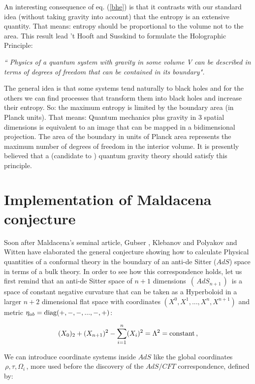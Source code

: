 \documentclass[a4paper,twocolumn,prd,groupedaddress,nofootinbib]{revtex4}
\begin{document}
An interesting consequence of eq. (\ref{bhe}) is that it contrasts with our standard
idea (without taking gravity into account) that the entropy 
is an extensive quantity. That means: entropy should be proportional to the  
volume not to the area.  This result lead 't Hooft and Susskind to formulate 
the Holographic  Principle:

{\it `` Physics of a quantum system with gravity in some \break volume V
can be described in terms of degrees of \break freedom that can be contained
in its boundary".}

\bigskip

\noindent  The general idea is that some systems tend naturally to black holes and
for the others we can find processes that transform them into black holes and increase 
their entropy. So: the maximum entropy is limited by the boundary area (in Planck units). 
That means:  Quantum mechanics plus gravity in 3 spatial dimensions is equivalent 
to an image that can be mapped  in a bidimensional projection.
The area of the boundary in units of  Planck area represents 
the  maximum number of degrees of freedom in the interior volume.
It is presently believed that a (candidate to ) quantum gravity theory
should satisfy this principle.

\vskip 1cm

\section{Implementation of Maldacena conjecture}

\bigskip
Soon after Maldacena's seminal article, Gubser , Klebanov and Polyakov\cite{GKP} and
Witten\cite{Wi} have elaborated the general conjecture showing  how to calculate
Physical quantities of a conformal theory  in the boundary of an anti-de Sitter ($AdS$)
space in terms of a bulk theory. In order to see how this correspondence holds,
let us first remind that an anti-de Sitter space of 
$n+1$ dimensions $\,(\,AdS_{n+1}\,)\,$ is a space of constant negative curvature  
that  can be taken as a Hyperboloid in a larger $n+2$ dimensional flat space
with coordinates  $(X^0,X^1,...,X^n,X^{n+1})$ and metric 
$\eta_{ab}={\rm diag}(+,-,-,...,-,+)$: 

\vskip 1cm

$$
(X_0)_2+(X_{n+1})^2-\sum_{i=1}^n(X_i)^2 = \Lambda^2={\rm constant}\,,
$$
 
\bigskip

\noindent  We can introduce coordinate systems inside $AdS$ like the global coordinates
 $\,\rho,\tau,\Omega_i\,$, more used before the discovery of the $AdS/CFT$ correspondence,
defined by:
\end{document}
